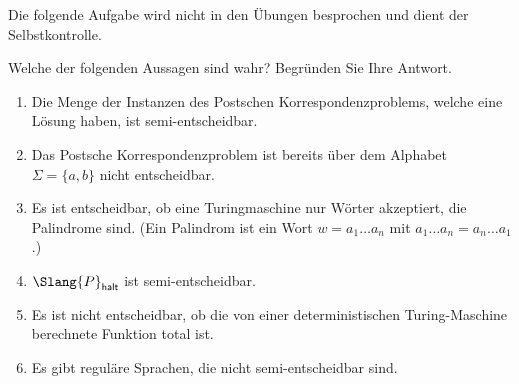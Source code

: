 \documentclass[german]{latteachCD}[2017/03/28]
\begin{document}
\maketitle

\begin{mdframed}
  Die folgende Aufgabe wird nicht in den Übungen besprochen und dient der
  Selbstkontrolle.

  \renewcommand{\theexercise}{\Alph{exercise}}
  \setcounter{exercise}{6}

  \begin{exercise}
    Welche der folgenden Aussagen sind wahr? Begründen Sie Ihre Antwort.
    \begin{enumerate}
    \item Die Menge der Instanzen des Postschen Korrespondenzproblems, welche
      eine Lösung haben, ist semi-entscheidbar.
    \item Das Postsche Korrespondenzproblem ist bereits über dem Alphabet
      $\Sigma = \{a, b\}$ nicht entscheidbar.
    \item Es ist entscheidbar, ob eine Turingmaschine nur Wörter akzeptiert, die
      Palindrome sind. (Ein Palindrom ist ein Wort $w = a_{1} \dots a_{n}$ mit
      $a_{1} \dots a_{n} = a_{n} \dots a_{1}$.)
    \item $\Slang{P}_{\mathsf{halt}}$ ist semi-entscheidbar.
    \item Es ist nicht entscheidbar, ob die von einer deterministischen
      Turing-Maschine berechnete Funktion total ist.
    \item Es gibt reguläre Sprachen, die nicht semi-entscheidbar sind.
    \end{enumerate}

    \vspace*{-0.5\baselineskip}
  \end{exercise}
\end{mdframed}

\vspace*{0.5\baselineskip}

\setcounter{exercise}{0}
\end{document}
